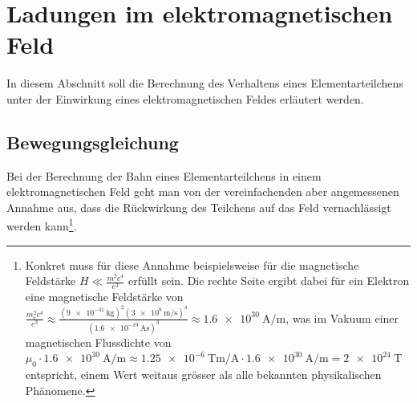 
\section{Ladungen im elektromagnetischen Feld
\label{relativ:section:em_feld}}

In diesem Abschnitt soll die Berechnung des Verhaltens eines Elementarteilchens
unter der Einwirkung eines elektromagnetischen Feldes erläutert werden.


\subsection{Bewegungsgleichung
\label{relativ:section:bewegungsgleichung}}

Bei der Berechnung der Bahn eines Elementarteilchens
in einem elektromagnetischen Feld geht man von
der vereinfachenden aber angemessenen Annahme aus,
dass die Rückwirkung des Teilchens auf das Feld vernachlässigt werden kann\footnote{
Konkret muss für diese Annahme beispielsweise
für die magnetische Feldstärke
\(H \ll \frac{m^2c^4}{e^3}\) erfüllt sein.
Die rechte Seite ergibt dabei für ein Elektron
eine magnetische Feldstärke von
\(\frac{m_e^2c^4}{e^3} \approx
\frac{(\qty{9e-31}{\kilogram})^2 (\qty{3e8}{\metre\per\second})^4}{(\qty{1.6e-19}{\ampere\second})^3}
\approx \qty[per-mode=fraction]{1.6e30}{\ampere\per\metre}\),
was im Vakuum einer magnetischen Flussdichte von
\(\mu_0 \cdot \qty[per-mode=fraction]{1.6e30}{\ampere\per\metre} \approx
\qty[per-mode=fraction]{1.25e-6}{\tesla\metre\per\ampere} \cdot
\qty[per-mode=fraction]{1.6e30}{\ampere\per\metre} =
\qty{2e24}{\tesla}\)
entspricht, einem Wert weitaus grösser als alle bekannten physikalischen Phänomene.}.

